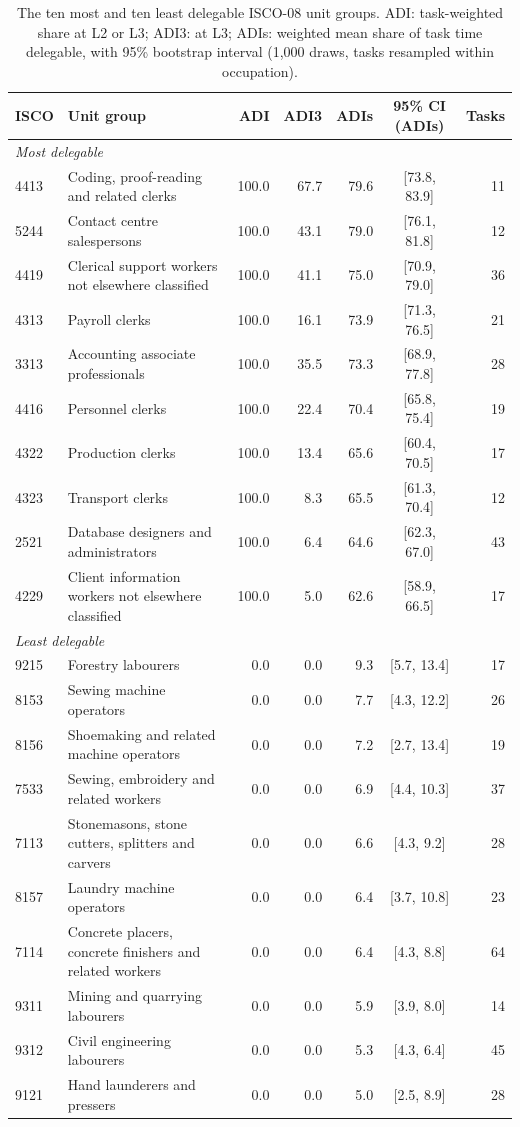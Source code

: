 \documentclass[preprint,12pt,authoryear]{elsarticle}
\begin{document}
%
%
\begin{table}[t]
\centering\footnotesize
\caption{The ten most and ten least delegable ISCO-08 unit groups. ADI: task-weighted share at L2 or L3; ADI3: at L3; ADIs: weighted mean share of task time delegable, with 95\% bootstrap interval (1,000 draws, tasks resampled within occupation).}
\label{tab:ocupaciones}
\begin{tabular}{lp{5.6cm}rrrcr}
\toprule
ISCO & Unit group & ADI & ADI3 & ADIs & 95\% CI (ADIs) & Tasks \\
\midrule
\multicolumn{7}{l}{\emph{Most delegable}}\\
4413 & Coding, proof-reading and related clerks & 100.0 & 67.7 & 79.6 & [73.8, 83.9] & 11 \\
5244 & Contact centre salespersons & 100.0 & 43.1 & 79.0 & [76.1, 81.8] & 12 \\
4419 & Clerical support workers not elsewhere classified & 100.0 & 41.1 & 75.0 & [70.9, 79.0] & 36 \\
4313 & Payroll clerks & 100.0 & 16.1 & 73.9 & [71.3, 76.5] & 21 \\
3313 & Accounting associate professionals & 100.0 & 35.5 & 73.3 & [68.9, 77.8] & 28 \\
4416 & Personnel clerks & 100.0 & 22.4 & 70.4 & [65.8, 75.4] & 19 \\
4322 & Production clerks & 100.0 & 13.4 & 65.6 & [60.4, 70.5] & 17 \\
4323 & Transport clerks & 100.0 & 8.3 & 65.5 & [61.3, 70.4] & 12 \\
2521 & Database designers and administrators & 100.0 & 6.4 & 64.6 & [62.3, 67.0] & 43 \\
4229 & Client information workers not elsewhere classified & 100.0 & 5.0 & 62.6 & [58.9, 66.5] & 17 \\
\midrule
\multicolumn{7}{l}{\emph{Least delegable}}\\
9215 & Forestry labourers & 0.0 & 0.0 & 9.3 & [5.7, 13.4] & 17 \\
8153 & Sewing machine operators & 0.0 & 0.0 & 7.7 & [4.3, 12.2] & 26 \\
8156 & Shoemaking and related machine operators & 0.0 & 0.0 & 7.2 & [2.7, 13.4] & 19 \\
7533 & Sewing, embroidery and related workers & 0.0 & 0.0 & 6.9 & [4.4, 10.3] & 37 \\
7113 & Stonemasons, stone cutters, splitters and carvers & 0.0 & 0.0 & 6.6 & [4.3, 9.2] & 28 \\
8157 & Laundry machine operators & 0.0 & 0.0 & 6.4 & [3.7, 10.8] & 23 \\
7114 & Concrete placers, concrete finishers and related workers & 0.0 & 0.0 & 6.4 & [4.3, 8.8] & 64 \\
9311 & Mining and quarrying labourers & 0.0 & 0.0 & 5.9 & [3.9, 8.0] & 14 \\
9312 & Civil engineering labourers & 0.0 & 0.0 & 5.3 & [4.3, 6.4] & 45 \\
9121 & Hand launderers and pressers & 0.0 & 0.0 & 5.0 & [2.5, 8.9] & 28 \\
\bottomrule
\end{tabular}
\end{table}
 
\end{document}
